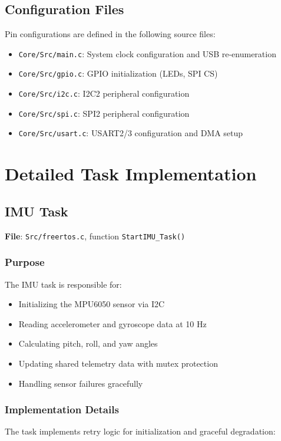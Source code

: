 \documentclass[11pt,a4paper]{article}
\begin{document}
\subsection{Configuration Files}

Pin configurations are defined in the following source files:
\begin{itemize}
    \item \texttt{Core/Src/main.c}: System clock configuration and USB re-enumeration
    \item \texttt{Core/Src/gpio.c}: GPIO initialization (LEDs, SPI CS)
    \item \texttt{Core/Src/i2c.c}: I2C2 peripheral configuration
    \item \texttt{Core/Src/spi.c}: SPI2 peripheral configuration
    \item \texttt{Core/Src/usart.c}: USART2/3 configuration and DMA setup
\end{itemize}

\section{Detailed Task Implementation}

\subsection{IMU Task}
\textbf{File}: \texttt{Src/freertos.c}, function \texttt{StartIMU\_Task()}

\subsubsection{Purpose}
The IMU task is responsible for:
\begin{itemize}
    \item Initializing the MPU6050 sensor via I2C
    \item Reading accelerometer and gyroscope data at 10 Hz
    \item Calculating pitch, roll, and yaw angles
    \item Updating shared telemetry data with mutex protection
    \item Handling sensor failures gracefully
\end{itemize}

\subsubsection{Implementation Details}
The task implements retry logic for initialization and graceful degradation:
\end{document}
